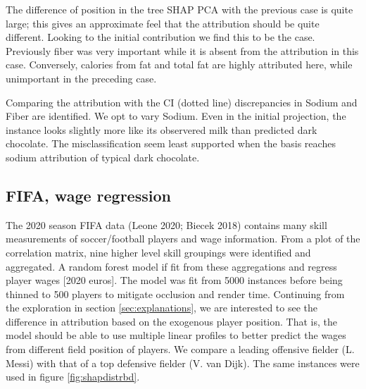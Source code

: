 \documentclass[
]{article}
\begin{document}
The difference of position in the tree SHAP PCA with the previous case is quite large; this gives an approximate feel that the attribution should be quite different. Looking to the initial contribution we find this to be the case. Previously fiber was very important while it is absent from the attribution in this case. Conversely, calories from fat and total fat are highly attributed here, while unimportant in the preceding case.

Comparing the attribution with the CI (dotted line) discrepancies in Sodium and Fiber are identified. We opt to vary Sodium. Even in the initial projection, the instance looks slightly more like its observered milk than predicted dark chocolate. The misclassification seem least supported when the basis reaches sodium attribution of typical dark chocolate.

\hypertarget{fifa-wage-regression}{%
\subsection{FIFA, wage regression}\label{fifa-wage-regression}}

The 2020 season FIFA data (Leone 2020; Biecek 2018) contains many skill measurements of soccer/football players and wage information. From a plot of the correlation matrix, nine higher level skill groupings were identified and aggregated. A random forest model if fit from these aggregations and regress player wages {[}2020 euros{]}. The model was fit from 5000 instances before being thinned to 500 players to mitigate occlusion and render time. Continuing from the exploration in section \ref{sec:explanations}, we are interested to see the difference in attribution based on the exogenous player position. That is, the model should be able to use multiple linear profiles to better predict the wages from different field position of players. We compare a leading offensive fielder (L. Messi) with that of a top defensive fielder (V. van Dijk). The same instances were used in figure \ref{fig:shapdistrbd}.
\end{document}
